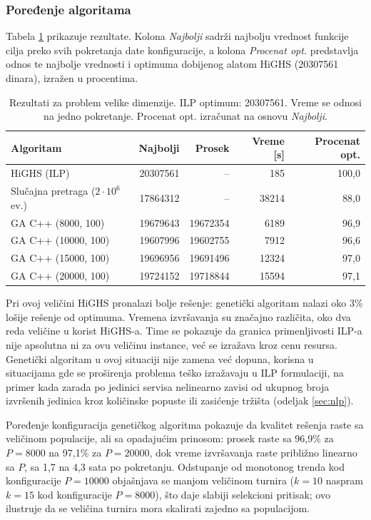 \documentclass[12pt]{article}
\begin{document}
\subsubsection{Poređenje algoritama}

Tabela \ref{tab:r1000} prikazuje rezultate. Kolona \textit{Najbolji} sadrži najbolju vrednost funkcije cilja preko svih pokretanja date konfiguracije, a kolona \textit{Procenat opt.} predstavlja odnos te najbolje vrednosti i optimuma dobijenog alatom HiGHS (20307561 dinara), izražen u procentima.

\begin{table}[H]
\centering
\begin{tabular}{|l|r|r|r|r|}
\hline
Algoritam & Najbolji & Prosek & Vreme [s] & Procenat opt. \\ \hline
HiGHS (ILP) & 20307561 & -- & 185 & 100,0 \\ \hline
Slučajna pretraga ($2 \cdot 10^6$ ev.) & 17864312 & -- & 38214 & 88,0 \\ \hline
GA C++ (8000, 100)  & 19679643 & 19672354 & 6189  & 96,9 \\ \hline
GA C++ (10000, 100) & 19607996 & 19602755 & 7912  & 96,6 \\ \hline
GA C++ (15000, 100) & 19696956 & 19691496 & 12324 & 97,0 \\ \hline
GA C++ (20000, 100) & 19724152 & 19718844 & 15594 & 97,1 \\ \hline
\end{tabular}
\caption{Rezultati za problem velike dimenzije. ILP optimum: 20307561. Vreme se odnosi na jedno pokretanje. Procenat opt. izračunat na osnovu \textit{Najbolji}.}
\label{tab:r1000}
\end{table}

Pri ovoj veličini HiGHS pronalazi bolje rešenje: genetički algoritam nalazi oko 3\% lošije rešenje od optimuma. Vremena izvršavanja su značajno različita, oko dva reda veličine u korist HiGHS-a. Time se pokazuje da granica primenljivosti ILP-a nije apsolutna ni za ovu veličinu instance, već se izražava kroz cenu resursa. Genetički algoritam u ovoj situaciji nije zamena već dopuna, korisna u situacijama gde se proširenja problema teško izražavaju u ILP formulaciji, na primer kada zarada po jedinici servisa nelinearno zavisi od ukupnog broja izvršenih jedinica kroz količinske popuste ili zasićenje tržišta (odeljak \ref{sec:nlp}).

Poređenje konfiguracija genetičkog algoritma pokazuje da kvalitet rešenja raste sa veličinom populacije, ali sa opadajućim prinosom: prosek raste sa 96{,}9\% za $P = 8000$ na 97{,}1\% za $P = 20000$, dok vreme izvršavanja raste približno linearno sa $P$, sa 1{,}7 na 4{,}3 sata po pokretanju. Odstupanje od monotonog trenda kod konfiguracije $P = 10000$ objašnjava se manjom veličinom turnira ($k = 10$ naspram $k = 15$ kod konfiguracije $P = 8000$), što daje slabiji selekcioni pritisak; ovo ilustruje da se veličina turnira mora skalirati zajedno sa populacijom.
\end{document}
